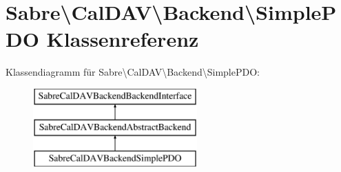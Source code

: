 \hypertarget{class_sabre_1_1_cal_d_a_v_1_1_backend_1_1_simple_p_d_o}{}\section{Sabre\textbackslash{}Cal\+D\+AV\textbackslash{}Backend\textbackslash{}Simple\+P\+DO Klassenreferenz}
\label{class_sabre_1_1_cal_d_a_v_1_1_backend_1_1_simple_p_d_o}
Klassendiagramm für Sabre\textbackslash{}Cal\+D\+AV\textbackslash{}Backend\textbackslash{}Simple\+P\+DO\+:\begin{figure}[H]
\begin{center}
\leavevmode
\includegraphics[height=3.000000cm]{class_sabre_1_1_cal_d_a_v_1_1_backend_1_1_simple_p_d_o}
\end{center}
\end{figure}
